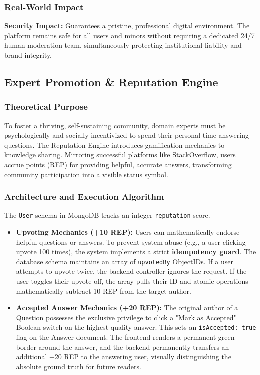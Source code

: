 \documentclass[12pt,a4paper]{article}
\begin{document}
\subsubsection{Real-World Impact}
\textbf{Security Impact:} Guarantees a pristine, professional digital environment. The platform remains safe for all users and minors without requiring a dedicated 24/7 human moderation team, simultaneously protecting institutional liability and brand integrity.

\newpage

\subsection{Expert Promotion \& Reputation Engine}

\subsubsection{Theoretical Purpose}
To foster a thriving, self-sustaining community, domain experts must be psychologically and socially incentivized to spend their personal time answering questions. The Reputation Engine introduces gamification mechanics to knowledge sharing. Mirroring successful platforms like StackOverflow, users accrue points (REP) for providing helpful, accurate answers, transforming community participation into a visible status symbol.

\subsubsection{Architecture and Execution Algorithm}
The \texttt{User} schema in MongoDB tracks an integer \texttt{reputation} score. 
\begin{itemize}
    \item \textbf{Upvoting Mechanics (+10 REP):} Users can mathematically endorse helpful questions or answers. To prevent system abuse (e.g., a user clicking upvote 100 times), the system implements a strict \textbf{idempotency guard}. The database schema maintains an array of \texttt{upvotedBy} ObjectIDs. If a user attempts to upvote twice, the backend controller ignores the request. If the user toggles their upvote off, the array pulls their ID and atomic operations mathematically subtract 10 REP from the target author.
    \item \textbf{Accepted Answer Mechanics (+20 REP):} The original author of a Question possesses the exclusive privilege to click a "Mark as Accepted" Boolean switch on the highest quality answer. This sets an \texttt{isAccepted: true} flag on the Answer document. The frontend renders a permanent green border around the answer, and the backend permanently transfers an additional +20 REP to the answering user, visually distinguishing the absolute ground truth for future readers.
\end{itemize}
\end{document}
